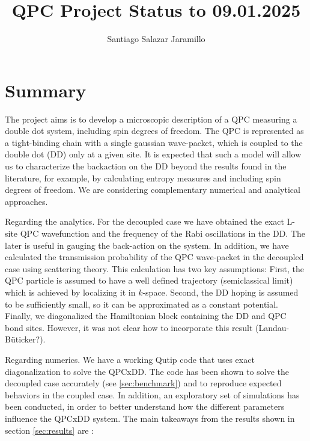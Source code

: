 \documentclass{article}
\title{QPC Project Status to 09.01.2025}
\author{Santiago Salazar Jaramillo}
\date{}
\begin{document}
\maketitle

\section{Summary}

The project aims is to develop a microscopic description of a QPC measuring a double dot system, including spin degrees of freedom. The QPC is represented as a tight-binding chain with a single gaussian wave-packet, which is coupled to the double dot (DD) only at a given site. It is expected that such a model will allow us to characterize the backaction on the DD beyond the results found in the literature, for example, by calculating entropy measures and including spin degrees of freedom. We are considering complementary numerical and analytical approaches. 

Regarding the analytics. For the decoupled case we have obtained the exact L-site QPC wavefunction and the frequency of the Rabi oscillations in the DD. The later is useful in gauging the back-action on the system. In addition, we have calculated the transmission probability of the QPC wave-packet in the decoupled case using scattering theory. This calculation has two key assumptions: First, the QPC particle is assumed to have a well defined trajectory (semiclassical limit) which is achieved by localizing it in $k$-space. Second, the DD hoping is assumed to be sufficiently small, so it can be approximated as a constant potential. Finally, we diagonalized the Hamiltonian block containing the DD and QPC bond sites. However, it was not clear how to incorporate this result (Landau-Büticker?).

Regarding numerics. We have a working Qutip code that uses exact diagonalization to solve the QPCxDD. The code has been shown to solve the decoupled case accurately (see \ref{sec:benchmark}) and to reproduce expected behaviors in the coupled case. In addition, an exploratory set of simulations has been conducted, in order to better understand how the different parameters influence the QPCxDD system. The main takeaways from the results shown in section \ref{sec:results} are :
\end{document}
